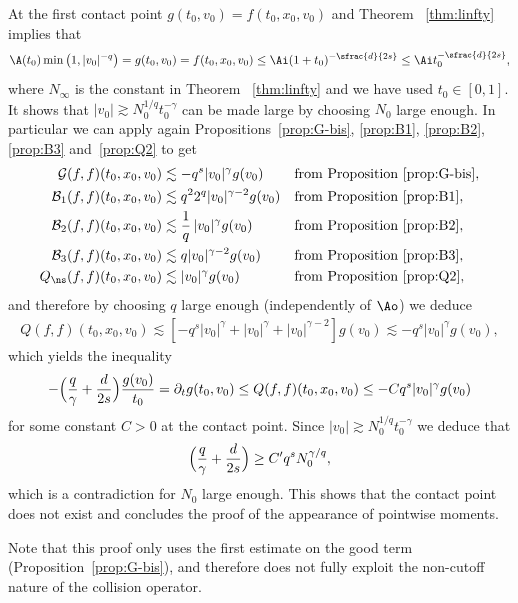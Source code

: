 At the first contact point $g(t_0,v_0)=f(t_0,x_0,v_0)$ and Theorem
~\ref{thm:linfty} implies that
\[
\A(t_0) \min\left(1,|v_0|^{-q}\right) =g(t_0,v_0) =f(t_0,x_0,v_0)
\leq \Ai (1+t_0)^{-\sfrac{d}{2s}} \leq \Ai t_0^{-\sfrac{d}{2s}},
\]
where $N_\infty$ is the constant in Theorem ~\ref{thm:linfty} and we
have used $t_0 \in [0,1]$. It shows that
$|v_0| \gtrsim N_0^{1/q} t_0^{-\gamma}$ can be made large by choosing
$N_0$ large enough. In particular we can apply again
Propositions~\ref{prop:G-bis}, \ref{prop:B1}, \ref{prop:B2},
\ref{prop:B3} and~\ref{prop:Q2} to get
\begin{align*}
\mathcal G(f,f)(t_0,x_0,v_0) &\lesssim - q^s |v_0|^{\gamma} g(v_0) && \text{from Proposition } \ref{prop:G-bis},\\
\mathcal B_1 (f,f)(t_0,x_0,v_0) &\lesssim q^2 2^q |v_0|^{\gamma-2} g(v_0) && \text{from Proposition } \ref{prop:B1}, \\
\mathcal B_2 (f,f)(t_0,x_0,v_0) &\lesssim \frac 1 q\, |v_0|^\gamma g(v_0) && \text{from Proposition } \ref{prop:B2},\\
\mathcal B_3 (f,f)(t_0,x_0,v_0) &\lesssim q |v_0|^{\gamma-2} g(v_0) && \text{from Proposition } \ref{prop:B3}, \\
Q_{\ns}(f,f)(t_0,x_0,v_0) &\lesssim |v_0|^{\gamma} g(v_0) && \text{from Proposition } \ref{prop:Q2},
\end{align*}
and therefore by choosing $q$ large enough (independently of $\Ao$) we
deduce
\begin{align*}
Q(f,f)(t_0,x_0,v_0) \lesssim \left[ - q^s |v_0|^{\gamma} +
|v_0|^\gamma + |v_0|^{\gamma-2} \right] g(v_0) \lesssim - q^s
|v_0|^{\gamma} g(v_0),
\end{align*}
which yields the inequality
\[
-\Bigl(\frac{q}{\gamma} + \frac{d}{2s} \Bigr) \frac{g(v_0)}{t_0} =
\partial_t g(t_0,v_0) \le
Q(f,f)(t_0,x_0,v_0) \le - C q^s |v_0|^{\gamma} g(v_0)
\]
for some constant $C>0$ at the contact point. Since $|v_0| \gtrsim
N_0^{1/q} t_0^{-\gamma}$ we deduce that
\[
\Bigl(\frac{q}{\gamma} + \frac{d}{2s} \Bigr) \ge C' q^s
N_0^{\gamma/q},
\]
which is a contradiction for $N_0$ large enough. This shows that the
contact point does not exist and concludes the proof of the appearance
of pointwise moments.

\begin{remark}
Note that this proof only uses the first estimate on the good term
(Proposition~\ref{prop:G-bis}), and therefore does not fully exploit
the non-cutoff nature of the collision operator.
\end{remark}

